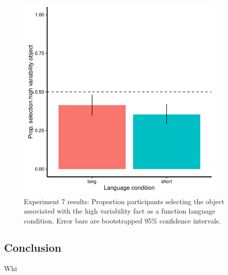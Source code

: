   \begin{figure}[t!]
 \begin{center}
  \includegraphics[width=4in]{figs/var_results.pdf}
  \caption{\label{fig:var_plot} Experiment 7 results: Proportion participants selecting the object associated with the high variability fact as a function language condition.  Error bars are bootstrapped 95\% confidence intervals.}
 \end{center}
\end{figure}

\subsection{Conclusion}
Whi









